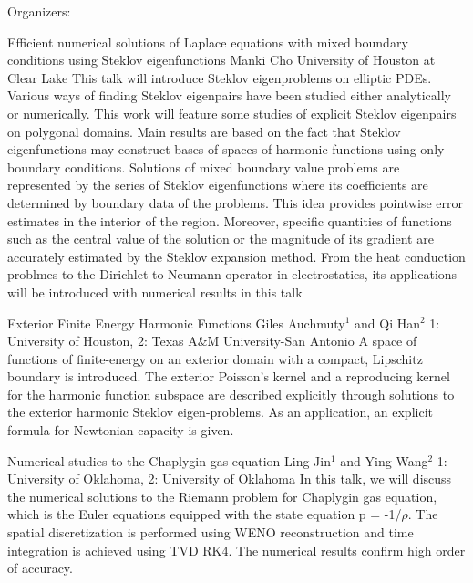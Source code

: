 \label{mini15}

\miniabs
{}
{Organizers: }
{}

\vspace{2ex}
\abs
{Efficient numerical solutions of Laplace equations with mixed boundary conditions using Steklov eigenfunctions }
{Manki Cho}
{University of Houston at Clear Lake}
{This talk will introduce Steklov eigenproblems on elliptic PDEs. Various ways of finding Steklov eigenpairs have been studied either analytically or numerically. This work will feature some studies of explicit Steklov eigenpairs on polygonal domains. Main results are based on the fact that Steklov eigenfunctions may construct bases of spaces of harmonic functions using only boundary conditions. Solutions of mixed boundary value problems are represented by the series of Steklov eigenfunctions where its coefficients are determined by boundary data of the problems. This idea provides pointwise error estimates in the interior of the region. Moreover, specific quantities of functions such as the central value of the solution or the magnitude of its gradient are accurately estimated by the Steklov expansion method. From the heat conduction problmes to the Dirichlet-to-Neumann operator in electrostatics, its applications will be introduced with numerical results in this talk}


\vspace{1.5ex}
\abs
{Exterior Finite Energy Harmonic Functions}
{Giles Auchmuty$^{1}$  and Qi Han$^{2}$}
{1: University of Houston, 2: Texas A\&M University-San Antonio}
{A space of functions of finite-energy on an exterior domain with a compact, Lipschitz boundary is introduced.
The exterior Poisson's kernel and a reproducing kernel for the harmonic function subspace are described explicitly through solutions to the exterior harmonic Steklov eigen-problems. As an application, an explicit formula for Newtonian capacity is given.}


\vspace{1.5ex}
\abs
{Numerical studies to the Chaplygin gas equation}
{Ling Jin$^{1}$ and Ying Wang$^{2}$}
{1: University of Oklahoma, 2: University of Oklahoma}
{In this talk, we will discuss the numerical solutions to the Riemann problem for Chaplygin gas equation, which is the Euler equations equipped with the state equation p = -1/$\rho$. The spatial discretization is performed using WENO reconstruction and time integration is achieved using TVD RK4. The numerical results confirm high order of accuracy.}


